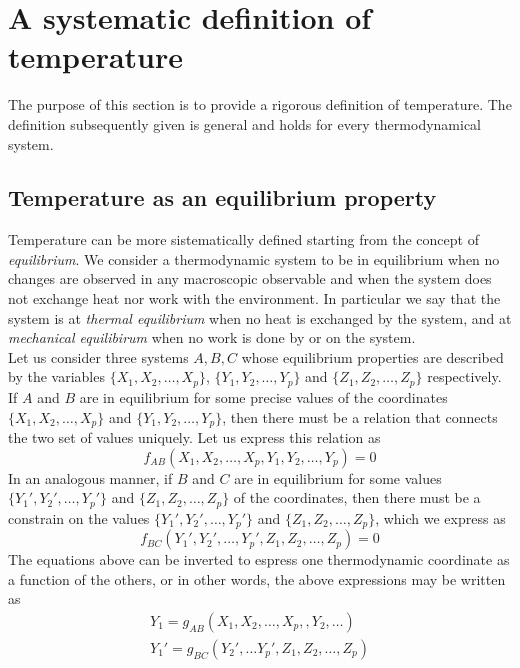 \chapter{A systematic definition of temperature}
\label{ch:temperature}

The purpose of this section is to provide a rigorous definition of temperature. The definition subsequently given is general and holds for every thermodynamical system.
\section{Temperature as an equilibrium property}
Temperature can be more sistematically defined starting from the concept of \emph{equilibrium}. We consider a thermodynamic system to be in equilibrium when 
no changes are observed in any macroscopic observable and when the system does not exchange heat nor work with the environment. In particular we say that the system is at \emph{thermal equilibrium} when no heat is exchanged by the system, and
at \emph{mechanical equilibirum} when no work is done by or on the system. \\
Let us consider three systems $A, B, C$ whose equilibrium properties are described by the variables
$\{X_1, X_2, \dots, X_p\}$, $\{Y_1, Y_2, \dots, Y_p\}$ and $\{Z_1, Z_2, \dots, Z_p\}$ respectively. \\
If $A$ and $B$ are in equilibrium for some precise values of the coordinates $\{X_1, X_2, \dots, X_p\}$ and $\{Y_1, Y_2, \dots, Y_p\}$, then there must be a relation that connects the two set of values uniquely. Let us express this relation as
\begin{equation}
    f_{AB}(X_1, X_2, \dots, X_p, Y_1, Y_2, \dots, Y_p) = 0
    \label{eq:constrain1}
\end{equation}
In an analogous manner, if $B$ and $C$ are in equilibrium for some values $\{Y_1', Y_2', \dots, Y_p'\}$ and $\{Z_1, Z_2, \dots, Z_p\}$ of the coordinates, then there must be a constrain on the values $\{Y_1', Y_2', \dots, Y_p'\}$ and $\{Z_1, Z_2, \dots, Z_p\}$, which we express as
\begin{equation}
    f_{BC}(Y_1', Y_2', \dots, Y_p', Z_1, Z_2, \dots, Z_p) = 0
    \label{eq:constrain2}
\end{equation}
The equations above can be inverted to espress one thermodynamic coordinate as a function of the others, or in other words, the above expressions may be written as
\begin{gather*}
    Y_1 = g_{AB} (X_1, X_2, \dots, X_p, , Y_2, \dots) \\
    Y_1' = g_{BC} (Y_2', \dots Y_p', Z_1, Z_2, \dots, Z_p)
\end{gather*}
